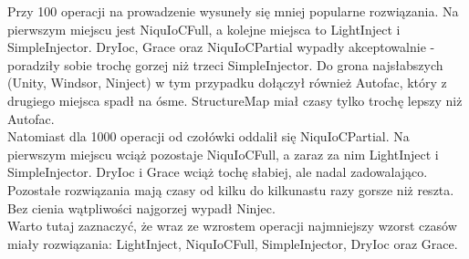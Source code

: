 \documentclass[12pt]{article}
\begin{document}
Przy 100 operacji na prowadzenie wysuneły się mniej popularne rozwiązania. Na pierwszym miejscu jest NiquIoCFull, a kolejne miejsca to LightInject i SimpleInjector. DryIoc, Grace oraz NiquIoCPartial wypadły akceptowalnie - poradziły sobie trochę gorzej niż trzeci SimpleInjector. Do grona najsłabszych (Unity, Windsor, Ninject) w tym przypadku dołączył również Autofac, który z drugiego miejsca spadł na ósme. StructureMap miał czasy tylko trochę lepszy niż Autofac.\\
Natomiast dla 1000 operacji od czołówki oddalił się NiquIoCPartial. Na pierwszym miejscu wciąż pozostaje NiquIoCFull, a zaraz za nim LightInject i SimpleInjector. DryIoc i Grace wciąż tochę słabiej, ale nadal zadowalająco. Pozostałe rozwiązania mają czasy od kilku do kilkunastu razy gorsze niż reszta. Bez cienia wątpliwości najgorzej wypadł Ninjec.\\
Warto tutaj zaznaczyć, że wraz ze wzrostem operacji najmniejszy wzorst czasów miały rozwiązania: LightInject, NiquIoCFull, SimpleInjector, DryIoc oraz Grace.
\end{document}
